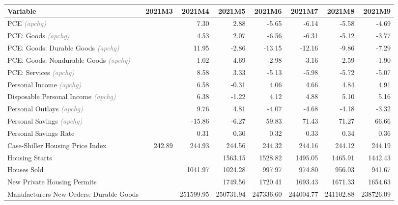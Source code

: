 \documentclass[11pt, letterpaper]{article}\usepackage[]{graphicx}\usepackage[]{color}
\begin{document}
\begin{table}[H]
\centering
\begingroup\fontsize{10pt}{12pt}\selectfont
\begin{tabular}{lrrrrrrr}
  \hline
Variable & 2021M3 & 2021M4 & 2021M5 & 2021M6 & 2021M7 & 2021M8 & 2021M9 \\ 
  \hline
PCE \textit{\footnotesize\textcolor{gray}{(apchg)}} &  & 7.30 & 2.88 & -5.65 & -6.14 & -5.58 & -4.69 \\ 
  PCE: Goods \textit{\footnotesize\textcolor{gray}{(apchg)}} &  & 4.53 & 2.07 & -6.56 & -6.31 & -5.12 & -3.77 \\ 
  PCE: Goods: Durable Goods \textit{\footnotesize\textcolor{gray}{(apchg)}} &  & 11.95 & -2.86 & -13.15 & -12.16 & -9.86 & -7.29 \\ 
  PCE: Goods: Nondurable Goods \textit{\footnotesize\textcolor{gray}{(apchg)}} &  & 1.02 & 4.69 & -2.98 & -3.16 & -2.59 & -1.90 \\ 
  PCE: Services \textit{\footnotesize\textcolor{gray}{(apchg)}} &  & 8.58 & 3.33 & -5.13 & -5.98 & -5.72 & -5.07 \\ 
  Personal Income \textit{\footnotesize\textcolor{gray}{(apchg)}} &  & 6.58 & -0.31 & 4.06 & 4.66 & 4.84 & 4.91 \\ 
  Disposable Personal Income \textit{\footnotesize\textcolor{gray}{(apchg)}} &  & 6.38 & -1.22 & 4.12 & 4.88 & 5.10 & 5.16 \\ 
  Personal Outlays \textit{\footnotesize\textcolor{gray}{(apchg)}} &  & 9.76 & 4.81 & -4.07 & -4.68 & -4.18 & -3.32 \\ 
  Personal Savings \textit{\footnotesize\textcolor{gray}{(apchg)}} &  & -15.86 & -6.27 & 59.83 & 71.43 & 71.27 & 66.66 \\ 
  Personal Savings Rate &  & 0.31 & 0.30 & 0.32 & 0.33 & 0.34 & 0.36 \\ 
  Case-Shiller Housing Price Index & 242.89 & 244.93 & 244.56 & 244.32 & 244.16 & 244.12 & 244.19 \\ 
  Housing Starts &  &  & 1563.15 & 1528.82 & 1495.05 & 1465.91 & 1442.43 \\ 
  Houses Sold &  & 1041.97 & 1024.28 & 997.97 & 974.80 & 956.03 & 941.67 \\ 
  New Private Housing Permits &  &  & 1749.56 & 1720.41 & 1693.43 & 1671.33 & 1654.63 \\ 
  Manufacturers New Orders: Durable Goods &  & 251599.95 & 250731.94 & 247336.60 & 244004.77 & 241102.88 & 238726.09 \\ 

\end{tabular}
\end{table}
\end{document}
